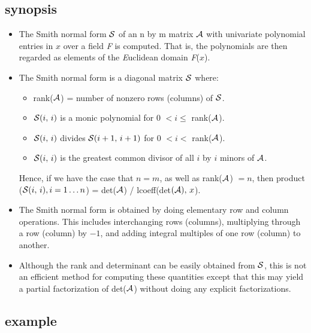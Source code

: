 \subsection{synopsis}

\begin{itemize}
\item The Smith normal form ${\cal S}$ of an n by m matrix ${\cal A}$ 
with univariate polynomial entries in $x$ over a field {\it F} is 
computed. That is, the polynomials are then regarded as elements of the
{\it E}uclidean domain {\it F}($x$).

\item The Smith normal form is a diagonal matrix ${\cal S}$ where:

  \begin{itemize}
  \item rank(${\cal A}$) = number of nonzero rows (columns) of 
        ${\cal S}$.
  \item ${\cal S}(i,\, i)$ is a monic polynomial for 0 $< i \leq $
        rank(${\cal A}$).
  \item ${\cal S}(i,\, i)$ divides ${\cal S}(i+1,\, i+1)$ for 0 $< i
        <$ rank(${\cal A}$).
  \item ${\cal S}(i,\,i)$ is the greatest common divisor of all $i$ by 
        $i$ minors of ${\cal A}$.
  \end{itemize}

      Hence, if we have the case that $n = m$, as well as 
      rank(${\cal A}$) $= n$, then product (${\cal S}(i,\,i), 
      i=1\ldots n$) = det(${\cal A}$) / lcoeff(det$({\cal A}), \, x$).

\item The Smith normal form is obtained by doing elementary row and 
      column operations. This includes interchanging rows (columns),
      multiplying through a row (column) by $-1$, and adding integral 
      multiples of one row (column) to another.

\item Although the rank and determinant can be easily obtained from 
      ${\cal S}$, this is not an efficient method for computing these 
      quantities except that this may yield a partial factorization of 
      det(${\cal A}$) without doing any explicit factorizations.

\end{itemize}

\subsection{example}

